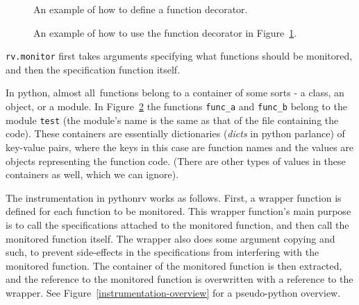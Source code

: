 \documentclass[a4paper,11pt]{kth-mag}
\begin{document}
\begin{figure}[h!]

	\begin{center}
	\begin{minipage}{0.7\textwidth}
	
	\end{minipage}
	\end{center}

	\caption{An example of how to define a function decorator.}
	\label{figure-function-decorator}
\end{figure}

\begin{figure}[h!]

	\begin{center}
	\begin{minipage}{0.7\textwidth}
	
	\end{minipage}
	\end{center}

	\caption{An example of how to use the function decorator in
	Figure~\ref{figure-function-decorator}.}
	\label{figure-function-decorator-usages}
\end{figure}

\texttt{rv.monitor} first takes arguments specifying what functions should be
monitored, and then the specification function itself.

In python, almost all\footnotemark\ functions belong to a container of some
sorts - a class, an object, or a module. In
Figure~\ref{figure-function-decorator-usages} the functions \texttt{func\_a}
and \texttt{func\_b} belong to the module \texttt{test} (the module's name is
the same as that of the file containing the code). These containers are
essentially dictionaries (\textit{dicts} in python parlance) of key-value
pairs, where the keys in this case are function names and the values are
objects representing the function code. (There are other types of values in
these containers as well, which we can ignore).


The instrumentation in pythonrv works as follows. First, a wrapper function is
defined for each function to be monitored. This wrapper function's main purpose
is to call the specifications attached to the monitored function, and then call
the monitored function itself. The wrapper also does some argument copying and
such, to prevent side-effects in the specifications from interfering with the
monitored function. The container of the monitored function is then extracted,
and the reference to the monitored function is overwritten with a reference to
the wrapper. See Figure~\ref{instrumentation-overview} for a pseudo-python
overview.
\end{document}
